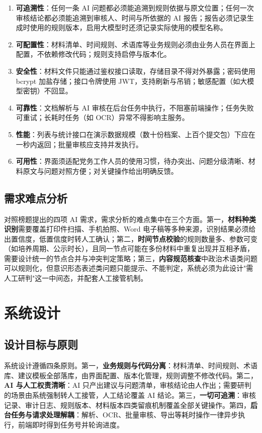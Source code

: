 \documentclass[12pt,a4paper]{ctexart}
\begin{document}
\begin{enumerate}[label=（\arabic*）]
  \item \textbf{可追溯性}：任何一条 AI 问题都必须能追溯到规则依据与原文位置；任何一次审核结论都必须能追溯到审核人、时间与所依据的 AI 报告；报告必须记录生成时使用的规则版本，启用大模型时还须记录实际使用的模型名称。
  \item \textbf{可配置性}：材料清单、时间规则、术语库等业务规则必须由业务人员在界面上配置，不依赖修改代码；规则支持启停与版本化。
  \item \textbf{安全性}：材料文件只能通过鉴权接口读取，存储目录不得对外暴露；密码使用 bcrypt 加盐存储；接口令牌使用 JWT，支持刷新与吊销；敏感配置（如大模型密钥）不回显。
  \item \textbf{可靠性}：文档解析与 AI 审核在后台任务中执行，不阻塞前端操作；任务失败可重试；长耗时任务（如 OCR）异常不得影响主服务。
  \item \textbf{性能}：列表与统计接口在演示数据规模（数十份档案、上百个提交包）下应在一秒内返回；批量审核应支持并发执行。
  \item \textbf{可用性}：界面须适配党务工作人员的使用习惯，待办突出、问题分级清晰、材料原文与问题对照方便；对关键操作给出明确反馈。
\end{enumerate}

\subsection{需求难点分析}

对照榜题提出的四项 AI 需求，需求分析的难点集中在三个方面。第一，\textbf{材料种类识别}需要覆盖打印件扫描、手机拍照、Word 电子稿等多种来源，识别结果必须给出置信度，低置信度时转人工确认；第二，\textbf{时间节点校验}的规则数量多、参数可变（如培养周期、公示时长），且同一节点可能在多份材料中重复出现并互相矛盾，需要设计统一的节点合并与冲突判定策略；第三，\textbf{内容规范核查}中政治术语类问题可以规则化，但意识形态表述类问题只能提示、不能判定，系统必须为此设计"需人工研判"这一中间态，并配套人工接管机制。

\clearpage
\section{系统设计}

\subsection{设计目标与原则}

系统设计遵循四条原则。第一，\textbf{业务规则与代码分离}：材料清单、时间规则、术语库、建议模板全部落库，由界面配置、版本化管理，规则调整不修改代码。第二，\textbf{AI 与人工权责清晰}：AI 只产出建议与问题清单，审核结论由人作出；需要研判的场景由系统强制转人工接管，人工结论覆盖 AI 结论。第三，\textbf{一切可追溯}：审核记录、审计日志、规则版本、材料版本四类留痕机制覆盖全部关键操作。第四，\textbf{后台任务与请求处理解耦}：解析、OCR、批量审核、导出等耗时操作一律异步执行，前端即时得到任务号并轮询进度。
\end{document}
